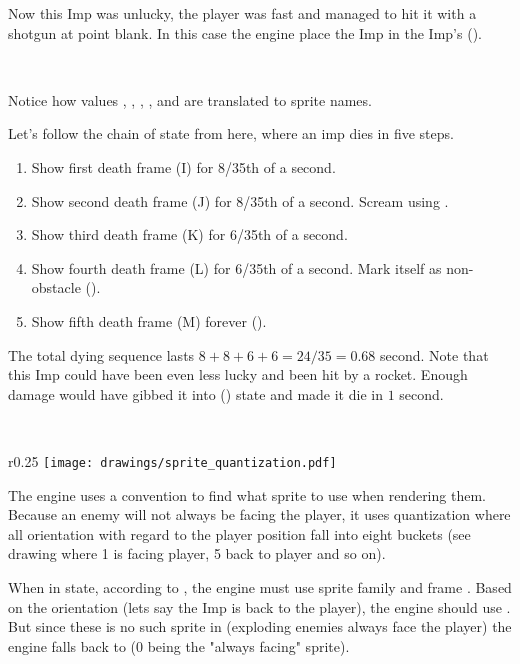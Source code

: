 Now this Imp was unlucky, the player was fast and managed to hit it with a shotgun at point blank. In this case the engine place the Imp in the Imp's  ().\\
\par
{}\\
\par
Notice how values , , , , and  are translated to sprite names.\\
\par
{}
\par


\pagebreak
Let's follow the chain of state from here, where an imp dies in five steps.

\begin{enumerate}
\item Show first death frame (I) for 8/35th of a second.
\item Show second death frame (J) for 8/35th of a second. Scream using .
\item Show third death frame (K) for 6/35th of a second.
\item Show fourth death frame (L) for 6/35th of a second. Mark itself as non-obstacle ().
\item Show fifth death frame (M) forever ().
\end{enumerate}
\par
The total dying sequence lasts $8+8+6+6=24/35 = 0.68$ second. Note that this Imp could have been even less lucky and been hit by a rocket. Enough damage would have gibbed it into  () state and made it die in $1$ second.\\
\par
{}\\
\par
{}




\par
\begin{wrapfigure}[9]{r}{0.25\textwidth}
\centering
\texttt{[image: drawings/sprite\_quantization.pdf]}
\end{wrapfigure}
The engine uses a convention to find what sprite to use when rendering them. Because an enemy will not always be facing the player, it uses quantization where all orientation with regard to the player position fall into eight buckets (see drawing where 1 is facing player, 5 back to player and so on).\\
\par
When in  state, according to , the engine must use sprite family  and frame . Based on the orientation (lets say the Imp is back to the player), the engine should use . But since these is no such sprite in  (exploding enemies always face the player) the engine falls back to  (0 being the "always facing" sprite).
\par







